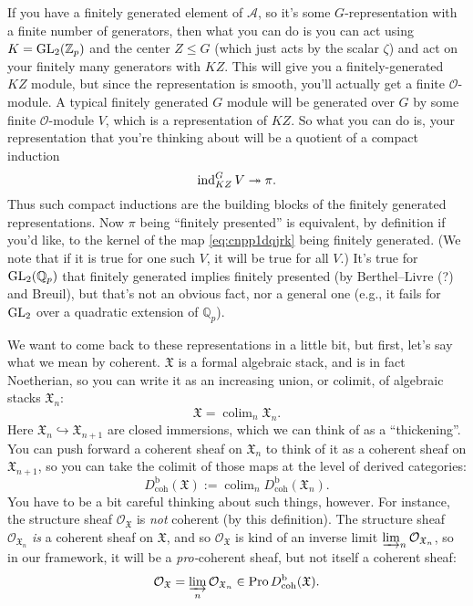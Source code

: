 \documentclass[reqno]{amsart} 
\begin{document}
If you have a finitely generated element of $\mathcal{A}$, so it's some $G$-representation with a finite number of generators, then what you can do is you can act using $K = \operatorname{GL}_2(\mathbb{Z}_p)$ and the center $Z \leq G$ (which just acts by the scalar $\zeta$) and act on your finitely many generators with $K Z$.  This will give you a finitely-generated $K Z$ module, but since the representation is smooth, you'll actually get a finite $\mathcal{O}$-module.  A typical finitely generated $G$ module will be generated over $G$ by some finite $\mathcal{O}$-module $V$, which is a representation of $K Z$.  So what you can do is, your representation that you're thinking about will be a quotient of a compact induction
\begin{equation}\label{eq:cnpp1dqjrk}
  \operatorname{ind}_{K Z}^{G} V \twoheadrightarrow \pi.
\end{equation}
Thus such compact inductions are the building blocks of the finitely generated representations.  Now $\pi$ being ``finitely presented'' is equivalent, by definition if you'd like, to the kernel of the map \eqref{eq:cnpp1dqjrk} being finitely generated.  (We note that if it is true for one such $V$, it will be true for all $V$.)  It's true for $\operatorname{GL}_2(\mathbb{Q}_p)$ that finitely generated implies finitely presented (by Berthel--Livre (?) and Breuil), but that's not an obvious fact, nor a general one (e.g., it fails for $\operatorname{GL}_2$ over a quadratic extension of $\mathbb{Q}_p$).

We want to come back to these representations in a little bit, but first, let's say what we mean by coherent. $\mathfrak{X}$ is a formal algebraic stack, and is in fact Noetherian, so you can write it as an increasing union, or colimit, of algebraic stacks $\mathfrak{X}_n$:
\begin{equation*}
  \mathfrak{X} = \operatorname{colim}_n \mathfrak{X}_n.
\end{equation*}
Here $\mathfrak{X}_n \hookrightarrow \mathfrak{X}_{n + 1}$ are closed immersions, which we can think of as a ``thickening''.  You can push forward a coherent sheaf on $\mathfrak{X}_n$ to think of it as a coherent sheaf on $\mathfrak{X}_{n + 1}$, so you can take the colimit of those maps at the level of derived categories:
\begin{equation*}
  D_{\mathrm{coh}}^{\mathrm{b}}(\mathfrak{X}) :=
  \operatorname{colim}_n D_{\mathrm{coh}}^{\mathrm{b}}(\mathfrak{X}_n).
\end{equation*}
You have to be a bit careful thinking about such things, however.  For instance, the structure sheaf $\mathcal{O}_{\mathfrak{X}}$ is \emph{not} coherent (by this definition).  The structure sheaf $\mathcal{O}_{\mathfrak{X}_n}$ \emph{is} a coherent sheaf on $\mathfrak{X}$, and so $\mathcal{O}_{\mathfrak{X}}$ is kind of an inverse limit $\varinjlim_n \mathcal{O}_{\mathfrak{X}_n}$, so in our framework, it will be a \emph{pro-}coherent sheaf, but not itself a coherent sheaf:
\begin{equation*}
  \mathcal{O}_{\mathfrak{X}} =  \varinjlim_n \mathcal{O}_{\mathfrak{X}_n} \in \operatorname{Pro}
  D_{\mathrm{coh}}^{\mathrm{b}}(\mathfrak{X}).
\end{equation*}
\end{document}

